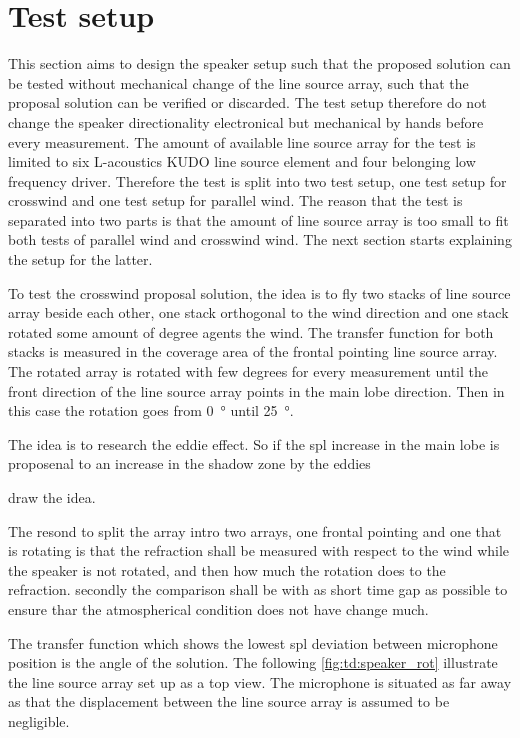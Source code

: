 \section{Test setup}\label{sec:pro:test_setup}
This section aims to design the speaker setup such that the proposed solution can be tested without mechanical change of the line source array, such that the proposal solution can be verified or discarded. The test setup therefore do not change the speaker directionality electronical but mechanical by hands before every measurement. The amount of available line source array for the test is limited to six L-acoustics KUDO line source element and four belonging low frequency driver. Therefore the test is split into two test setup, one test setup for crosswind and one test setup for parallel wind. The reason that the test is separated into two parts is that the amount of line source array is too small to fit both tests of parallel wind and crosswind wind. The next section starts explaining the setup for the latter.

To test the crosswind proposal solution, the idea is to fly two stacks of line source array beside each other, one stack orthogonal to the wind direction and one stack rotated some amount of degree agents the wind. The transfer function for both stacks is measured in the coverage area of the frontal pointing line source array. The rotated array is rotated with few degrees for every measurement until the front direction of the line source array points in the  main lobe direction. Then in this case the rotation goes from \SI{0}{\degree} until \SI{25}{\degree}. 

The idea is to research the eddie effect. So if the \gls{spl} increase in the main lobe is proposenal to an increase in the shadow zone by the eddies

draw the idea. 


The resond to split the array intro two arrays, one frontal pointing and one that is rotating is that the refraction shall be measured with respect to the wind while the speaker is not rotated, and then how much the rotation does to the refraction. secondly the comparison shall be with as short time gap as possible to ensure thar the atmospherical condition does not have change much.


The transfer function which shows the lowest \gls{spl} deviation between microphone position is the angle of the solution. The following \autoref{fig:td:speaker_rot} illustrate the line source array set up as a top view. The microphone is situated as far away as that the displacement between the line source array is assumed to be negligible.

